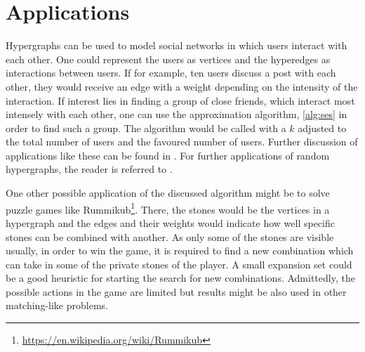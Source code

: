 \chapter{Applications}\label{chapter:applications}
Hypergraphs can be used to model social networks in which users interact with each other. One could represent the users as vertices and the hyperedges as interactions between users. If for example, ten users discuss a post with each other, they would receive an edge with a weight depending on the intensity of the interaction. If interest lies in finding a group of close friends, which interact most intensely with each other, one can use the approximation algorithm, \cref{alg:ses} in order to find such a group. The algorithm would be called with a $k$ adjusted to the total number of users and the favoured number of users. Further discussion of applications like these can be found in \cite{zhang2010hypergraph}. For further applications of random hypergraphs, the reader is referred to \cite{ghoshal2009random}.

One other possible application of the discussed algorithm might be to solve puzzle games like Rummikub\footnote{\href{https://en.wikipedia.org/wiki/Rummikub}{https://en.wikipedia.org/wiki/Rummikub}}. There, the stones would be the vertices in a hypergraph and the edges and their weights would indicate how well specific stones can be combined with another. As only some of the stones are visible usually, in order to win the game, it is required to find a new combination which can take in some of the private stones of the player. A small expansion set could be a good heuristic for starting the search for new combinations. Admittedly, the possible actions in the game are limited but results might be also used in other matching-like problems.

